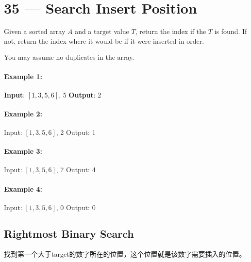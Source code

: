 \section{35 --- Search Insert Position}
Given a sorted array $A$ and a target value $T$, return the index if the $T$ is found. If not, return the index where it would be if it were inserted in order.

You may assume no duplicates in the array.

\paragraph{Example 1:}

\begin{flushleft}
\textbf{Input}: $[1,3,5,6]$, 5
\textbf{Output}: 2

\end{flushleft}

\paragraph{Example 2:}

\begin{flushleft}
Input: $[1,3,5,6]$, 2
Output: 1
\end{flushleft}

\paragraph{Example 3:}

\begin{flushleft}
Input: $[1,3,5,6]$, 7
Output: 4
\end{flushleft}

\paragraph{Example 4:}

\begin{flushleft}
Input: $[1,3,5,6]$, 0
Output: 0
\end{flushleft}

\subsection{Rightmost Binary Search}
找到第一个大于target的数字所在的位置，这个位置就是该数字需要插入的位置。

